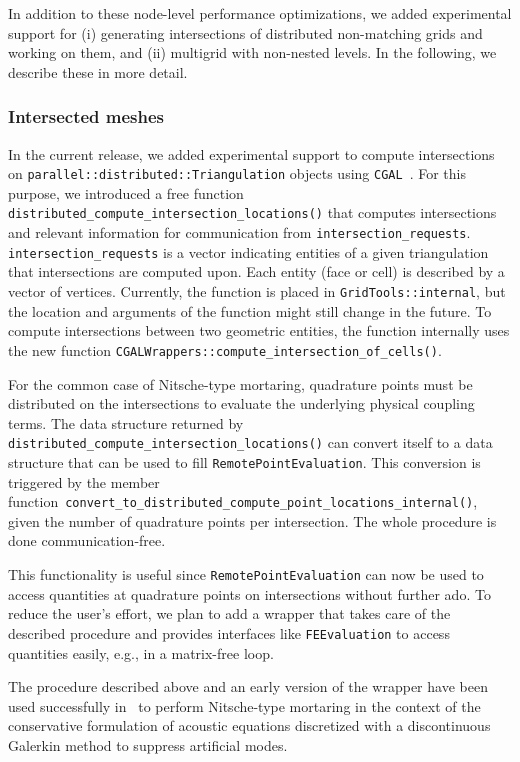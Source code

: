 \documentclass{ansarticle-preprint}
\begin{document}
In addition to these node-level performance optimizations, we added experimental
support for (i) generating intersections of distributed
non-matching grids and working on them,
and (ii) multigrid with non-nested levels. In the following, we describe these
in more detail.

\subsubsection{Intersected meshes}
In the current release, we added experimental support to compute intersections on \texttt{parallel::distributed::Triangulation} objects using \texttt{CGAL}~\cite{cgal-user-ref}.
For this purpose, we introduced a free function \texttt{distributed\_compute\_intersection\_locations()} that computes intersections and relevant information for communication from \texttt{intersection\_requests}.
\texttt{intersection\_requests} is a vector indicating entities of a given triangulation that intersections are computed upon.
Each entity (face or cell) is described by a vector of vertices.
Currently, the function is placed in \texttt{GridTools::internal}, but the location and arguments of the function might still change in the future.
To compute intersections between two geometric entities, the function internally uses the new function \texttt{CGALWrappers::compute\_intersection\_of\_cells()}.

For the common case of Nitsche-type mortaring, quadrature points must be distributed on the intersections to evaluate the underlying physical coupling terms.
The data structure returned by \texttt{distributed\_compute\_intersection\_locations()} can convert itself to a data structure that can be used to fill \texttt{RemotePointEvaluation}.
This conversion is triggered by the member function~\texttt{convert\_to\_distributed\_compute\_point\_locations\_internal()}, given the number of quadrature points per intersection.
The whole procedure is done communication-free.

This functionality is useful since \texttt{RemotePointEvaluation} can now be used to access quantities at quadrature points on intersections without further ado.
To reduce the user's effort, we plan to add a wrapper that takes care of the described procedure and provides interfaces like \texttt{FEEvaluation} to access quantities easily, e.g., in a matrix-free loop.

The procedure described above and an early version of the wrapper have
been used successfully in~\cite{heinz2023high} to perform Nitsche-type
mortaring in the context of the conservative formulation of acoustic
equations discretized with a discontinuous Galerkin method to suppress
artificial modes.
\end{document}
